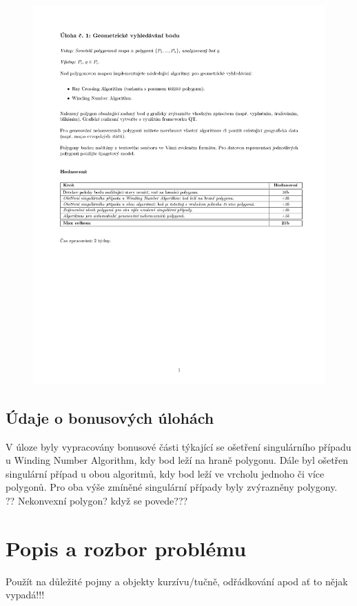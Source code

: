 \documentclass[a4paper, 12pt]{article}
\begin{document}
\begin{figure}[h!]
	\centering
	\includegraphics[clip, trim=0cm 10cm 0cm 3cm, width=1.2\textwidth]{zadani.pdf}
\end{figure}

\subsection{Údaje o bonusových úlohách}
V úloze byly vypracovány bonusové části týkající se ošetření singulárního případu u Winding Number Algorithm, kdy bod leží na hraně polygonu. Dále byl ošetřen singulární případ u obou algoritmů, kdy bod leží ve vrcholu jednoho či více polygonů. Pro oba výše zmíněné singulární případy byly zvýrazněny polygony. \\

?? Nekonvexní polygon? když se povede???


\clearpage

\section{Popis a rozbor problému}
Použít na důležité pojmy a objekty kurzívu/tučně, odřádkování apod ať to nějak vypadá!!!\\
\end{document}
